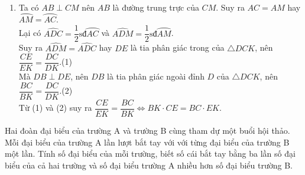 \begin{ex}
{\begin{enumerate}
\begin{itemize}
Mà $\widehat{IDB}=\widehat{MCB}$ (hai góc nội tiếp cùng chắn $\wideparen{BM}$).\\
Suy ra $\widehat{IEB}=\widehat{MCB}$. Mà $\widehat{IEB}$, $\widehat{MCB}$ ở vị trí đồng vị, nên $CM\parallel EI$.\\
Mà $IE\perp AB$. Vậy $CM\perp AB$.
\end{itemize} 
\item Ta có $AB\perp CM$ nên $AB$ là đường trung trực của $CM$. Suy ra $AC=AM$ hay $\wideparen{AM}=\wideparen{AC}$.\\
Lại có $\widehat{ADC}=\dfrac{1}{2}\text{sđ}\wideparen{AC}$ và $\widehat{ADM}=\dfrac{1}{2}\text{sđ}\wideparen{AM}$.\\
Suy ra $\widehat{ADM}=\widehat{ADC}$ hay $DE$ là tia phân giác trong của $\triangle DCK$,
nên $\dfrac{CE}{EK}=\dfrac{DC}{DK}$.\hfill (1)\\
Mà $DB\perp DE$, nên $DB$ là tia phân giác ngoài đỉnh $D$ của $\triangle DCK$,
nên $\dfrac{BC}{BK}=\dfrac{DC}{DK}$.\hfill (2)\\
Từ (1) và (2) suy ra $\dfrac{CE}{EK}=\dfrac{BC}{BK}\Leftrightarrow BK\cdot CE=BC\cdot EK$.
\end{enumerate}
}
\end{ex}

\begin{ex}%
Hai đoàn đại biểu của trường A và trường B cùng tham dự một buổi hội thảo. Mỗi đại biểu của trường A lần lượt bắt tay với với từng đại biểu của trường B một lần. Tính số đại biểu của mỗi trường, biết số cái bắt tay bằng ba lần số đại biểu của cả hai trường và số đại biểu trường A nhiều hơn số đại biểu trường B.
\end{ex}

